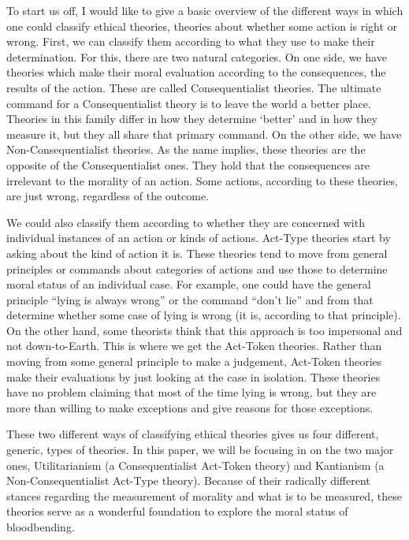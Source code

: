 To start us off, I would like to give a basic overview of the different ways in which one could classify ethical theories, theories about whether some action is right or wrong. First, we can classify them according to what they use to make their determination. For this, there are two natural categories. On one side, we have theories which make their moral evaluation according to the consequences, the results of the action. These are called Consequentialist theories. The ultimate command for a Consequentialist theory is to leave the world a better place. Theories in this family differ in how they determine ‘better’ and in how they measure it, but they all share that primary command. On the other side, we have Non-Consequentialist theories. As the name implies, these theories are the opposite of the Consequentialist ones. They hold that the consequences are irrelevant to the morality of an action. Some actions, according to these theories, are just wrong, regardless of the outcome.

We could also classify them according to whether they are concerned with individual instances of an action or kinds of actions. Act-Type theories start by asking about the kind of action it is. These theories tend to move from general principles or commands about categories of actions and use those to determine moral status of an individual case. For example, one could have the general principle “lying is always wrong” or the command “don’t lie” and from that determine whether some case of lying is wrong (it is, according to that principle). On the other hand, some theorists think that this approach is too impersonal and not down-to-Earth. This is where we get the Act-Token theories. Rather than moving from some general principle to make a judgement, Act-Token theories make their evaluations by just looking at the case in isolation. These theories have no problem claiming that most of the time lying is wrong, but they are more than willing to make exceptions and give reasons for those exceptions.

These two different ways of classifying ethical theories gives us four different, generic, types of theories. In this paper, we will be focusing in on the two major ones, Utilitarianism (a Consequentialist Act-Token theory) and Kantianism (a Non-Consequentialist Act-Type theory). Because of their radically different stances regarding the measurement of morality and what is to be measured, these theories serve as a wonderful foundation to explore the moral status of bloodbending.

